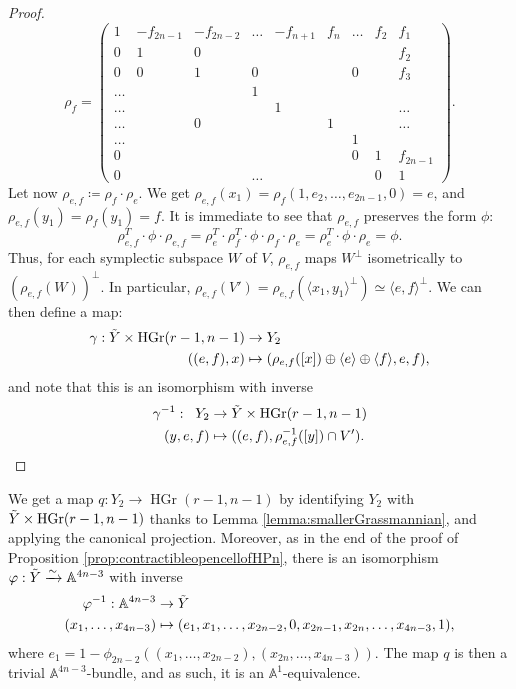 \documentclass[10pt]{amsart}
\theoremstyle{definition}
\theoremstyle{plain}
\numberwithin{equation}{section}
\newcommand{\0}{\emptyset}
\newcommand{\A}{{\mathbb A}}
\newcommand{\HGr}{{\operatorname{HGr}}}
\begin{document}
\begin{proof}
$$\rho_f=
\begin{pmatrix}
    1 & -f_{2n-1} & -f_{2n-2} & \ldots & -f_{n+1} & f_n & \ldots & f_2 & f_1 \\
    0 & 1 & 0 & & & & & & f_2 \\
    0 & 0 & 1 & 0 & & & 0 & & f_3 \\
    \ldots  & & & 1 & & & & & \\
    \ldots & & & & 1 & & & & \ldots \\
    \ldots & & 0 & & & 1 & & & \ldots \\
    \ldots & & & & & & 1 & & \\
    0 & & & & & & 0 & 1 & f_{2n-1} \\
    0 & & & \ldots & & & & 0 & 1
\end{pmatrix}.
$$
Let now $\rho_{e,f}\coloneqq \rho_f \cdot \rho_e$. We get $\rho_{e,f}(x_1)=\rho_f(1, e_2, \ldots, e_{2n-1},0)=e$, and $\rho_{e,f}(y_1)=\rho_f(y_1)=f$. It is immediate to see that $\rho_{e,f}$ preserves the form $\phi$: 
$$\rho_{e,f}^T \cdot \phi \cdot \rho_{e,f}=\rho_e^T\cdot \rho_f^T \cdot \phi \cdot \rho_f \cdot \rho_e = \rho_e^T \cdot \phi \cdot \rho_e = \phi.$$
Thus, for each symplectic subspace $W$ of $V$, $\rho_{e,f}$ maps $W^{\perp}$ isometrically to $(\rho_{e,f}(W))^{\perp}$. In particular, $\rho_{e,f}(V')=\rho_{e,f}(\langle x_1,y_1\rangle^{\perp}) \simeq \langle e,f \rangle^{\perp}$. We can then define a map:
\begin{align*}
    \gamma:\Tilde{Y}\times \HGr(r-1,n-1) & \to Y_2 \\
    ((e,f),x) & \mapsto (\rho_{e,f}([x])\oplus \langle e \rangle \oplus \langle f \rangle, e, f),
\end{align*}
and note that this is an isomorphism with inverse
\begin{align*}
    \gamma^{-1}: \; \;  Y_2 & \to \Tilde{Y}\times \HGr(r-1,n-1)\\
    (y,e,f) & \mapsto ((e,f), \rho_{e,f}^{-1}([y])\cap V').
\end{align*}
\end{proof}

We get a map $q:Y_2 \to \HGr(r-1,n-1)$ by identifying $Y_2$ with $\Tilde{Y}\times \HGr(r-1,n-1)$ thanks to Lemma \ref{lemma:smallerGrassmannian}, and applying the canonical projection. Moreover, as in the end of the proof of Proposition \ref{prop:contractibleopencellofHPn}, there is an isomorphism $\varphi:\Tilde{Y} \xrightarrow{\sim}\A^{4n-3}$ with inverse
\begin{align*}
    \varphi^{-1}:\mathbb{A}^{4n-3} & \to \Tilde{Y}\\
    (x_1,\ldots,x_{4n-3}) &\mapsto (e_1,x_1,\ldots,x_{2n-2},0,x_{2n-1}, x_{2n}, \ldots, x_{4n-3},1),
\end{align*}
where $e_1=1-\phi_{2n-2}((x_1,\ldots,x_{2n-2}),(x_{2n},\ldots,x_{4n-3}))$. The map $q$ is then a trivial $\mathbb{A}^{4n-3}$-bundle, and as such, it is an $\mathbb{A}^1$-equivalence.
\end{document}
